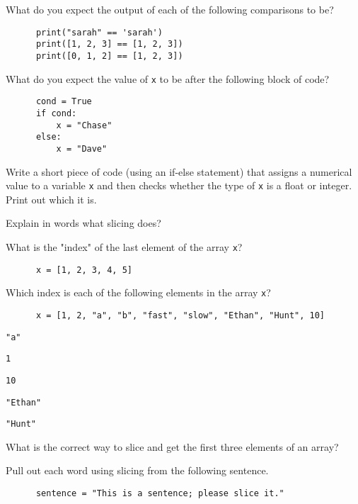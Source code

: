 \documentclass[11pt]{article}
\begin{document}
\begin{questions}
  \item What do you expect the output of each of the following comparisons to be?
    \begin{verbatim}
      print("sarah" == 'sarah')
      print([1, 2, 3] == [1, 2, 3])
      print([0, 1, 2] == [1, 2, 3])
    \end{verbatim}

  \item What do you expect the value of \texttt{x} to be after the following block of code?
    \begin{verbatim}
      cond = True
      if cond:
          x = "Chase"
      else:
          x = "Dave"
    \end{verbatim}

  \item Write a short piece of code (using an if-else statement) that assigns a numerical value to a variable \texttt{x} and then checks whether the type of \texttt{x} is a float or integer. Print out which it is.

  \item Explain in words what slicing does?

  \item What is the "index" of the last element of the array \texttt{x}?
    \begin{verbatim}
      x = [1, 2, 3, 4, 5]
    \end{verbatim}

  \item Which index is each of the following elements in the array \texttt{x}?
    \begin{verbatim}
      x = [1, 2, "a", "b", "fast", "slow", "Ethan", "Hunt", 10]
    \end{verbatim}
    \begin{part}
      \item \texttt{"a"}
      \item \texttt{1}
      \item \texttt{10}
      \item \texttt{"Ethan"}
      \item \texttt{"Hunt"}
    \end{part}

  \item What is the correct way to slice and get the first three elements of an array?

  \item Pull out each word using slicing from the following sentence.
    \begin{verbatim}
      sentence = "This is a sentence; please slice it."
    \end{verbatim}


\end{questions}
\end{document}
